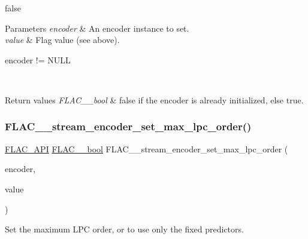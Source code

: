 {\ttfamily false} 
\begin{DoxyParams}{Parameters}
{\em encoder} & An encoder instance to set. \\
\hline
{\em value} & Flag value (see above).  
\begin{DoxyCode}
encoder != NULL 
\end{DoxyCode}
 \\
\hline
\end{DoxyParams}

\begin{DoxyRetVals}{Return values}
{\em F\+L\+A\+C\+\_\+\+\_\+bool} & {\ttfamily false} if the encoder is already initialized, else {\ttfamily true}. \\
\hline
\end{DoxyRetVals}
\mbox{\label{group__flac__stream__encoder_gac3bde5abdaa340674c5659e2e85d2611}} 
\subsubsection{\texorpdfstring{F\+L\+A\+C\+\_\+\+\_\+stream\+\_\+encoder\+\_\+set\+\_\+max\+\_\+lpc\+\_\+order()}{FLAC\_\_stream\_encoder\_set\_max\_lpc\_order()}}
{\footnotesize\ttfamily \hyperlink{group__flac__export_ga56ca07df8a23310707732b1c0007d6f5}{F\+L\+A\+C\+\_\+\+A\+PI} \hyperlink{ordinals_8h_a95103469f1cbd78b8cf250194985b34e}{F\+L\+A\+C\+\_\+\+\_\+bool} F\+L\+A\+C\+\_\+\+\_\+stream\+\_\+encoder\+\_\+set\+\_\+max\+\_\+lpc\+\_\+order (\begin{DoxyParamCaption}\item[{\hyperlink{struct_f_l_a_c_____stream_encoder}{F\+L\+A\+C\+\_\+\+\_\+\+Stream\+Encoder} $\ast$}]{encoder,  }\item[{unsigned}]{value }\end{DoxyParamCaption})}

Set the maximum L\+PC order, or {} to use only the fixed predictors.

